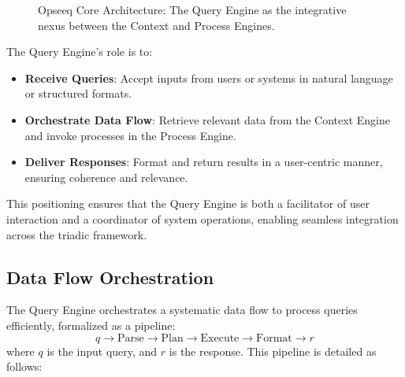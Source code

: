 \documentclass[11pt]{article}
\begin{document}
\begin{figure}[ht]
    \centering
    \caption{Opseeq Core Architecture: The Query Engine as the integrative nexus between the Context and Process Engines.}
    \label{fig:architecture_diagram}
\end{figure}

The Query Engine’s role is to:
\begin{itemize}
    \item \textbf{Receive Queries}: Accept inputs from users or systems in natural language or structured formats.
    \item \textbf{Orchestrate Data Flow}: Retrieve relevant data from the Context Engine and invoke processes in the Process Engine.
    \item \textbf{Deliver Responses}: Format and return results in a user-centric manner, ensuring coherence and relevance.
\end{itemize}

This positioning ensures that the Query Engine is both a facilitator of user interaction and a coordinator of system operations, enabling seamless integration across the triadic framework.

\subsection{Data Flow Orchestration}
\label{subsec:data_flow}

The Query Engine orchestrates a systematic data flow to process queries efficiently, formalized as a pipeline:
\[
q \rightarrow \text{Parse} \rightarrow \text{Plan} \rightarrow \text{Execute} \rightarrow \text{Format} \rightarrow r
\]
where \( q \) is the input query, and \( r \) is the response. This pipeline is detailed as follows:
\end{document}
